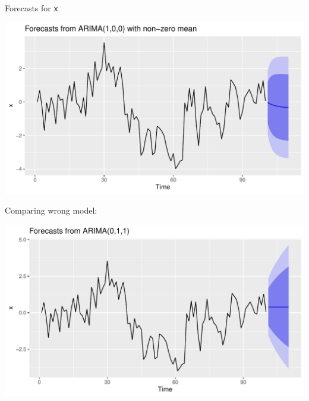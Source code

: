 \documentclass[ignorenonframetext,]{beamer}
\newenvironment{Shaded}{\begin{snugshade}}{\end{snugshade}}
\newcommand{\KeywordTok}[1]{\textcolor[rgb]{0.13,0.29,0.53}{\textbf{#1}}}
\newcommand{\NormalTok}[1]{#1}
\newcommand{\OperatorTok}[1]{\textcolor[rgb]{0.81,0.36,0.00}{\textbf{#1}}}
\newcommand{\StringTok}[1]{\textcolor[rgb]{0.31,0.60,0.02}{#1}}
\begin{document}
\begin{frame}[fragile]{Forecasts for \texttt{x}}
\protect\hypertarget{forecasts-for-x}{}

\begin{Shaded}
\end{Shaded}

\includegraphics{figure/unnamed-chunk-565-1.pdf}

\end{frame}

\begin{frame}[fragile]{Comparing wrong model:}
\protect\hypertarget{comparing-wrong-model}{}

\begin{Shaded}
\end{Shaded}

\includegraphics{figure/unnamed-chunk-566-1.pdf}

\end{frame}
\end{document}
